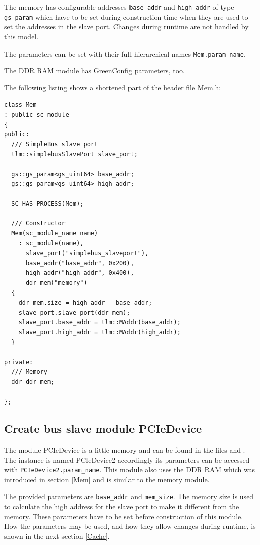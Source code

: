 The memory has configurable addresses \lstinline|base_addr| and
\lstinline|high_addr| of type \lstinline|gs_param| which have to be
set during construction time when they are used to set the addresses
in the slave port. Changes during runtime are not handled by this model.

The parameters can be set with their full hierarchical names \lstinline|Mem.param_name|.

The DDR RAM module has GreenConfig parameters, too.

The following listing shows a shortened part of the header file Mem.h:

\begin{lstlisting}
class Mem
: public sc_module
{
public:
  /// SimpleBus slave port
  tlm::simplebusSlavePort slave_port;

  gs::gs_param<gs_uint64> base_addr;
  gs::gs_param<gs_uint64> high_addr;

  SC_HAS_PROCESS(Mem);

  /// Constructor
  Mem(sc_module_name name)
    : sc_module(name),
      slave_port("simplebus_slaveport"),
      base_addr("base_addr", 0x200),
      high_addr("high_addr", 0x400),
      ddr_mem("memory")
  { 
    ddr_mem.size = high_addr - base_addr;
    slave_port.slave_port(ddr_mem);
    slave_port.base_addr = tlm::MAddr(base_addr);
    slave_port.high_addr = tlm::MAddr(high_addr);
  }

private:
  /// Memory
  ddr ddr_mem;

};
\end{lstlisting}

\subsection{Create bus slave module PCIeDevice}

The module PCIeDevice is a little memory and can be found in the files  and . The instance is named PCIeDevice2 accordingly its parameters can be accessed with \lstinline|PCIeDevice2.param_name|. This module also uses the DDR RAM which was introduced in section \ref{Mem} and is similar to the memory module.

The provided parameters are \lstinline|base_addr| and
\lstinline|mem_size|. The memory size is used to calculate the high
address for the slave port to make it different from the memory. These
parameters have to be set before construction of this module. How the
parameters may be used, and how they allow changes during runtime, is
shown in the next section \ref{Cache}.


